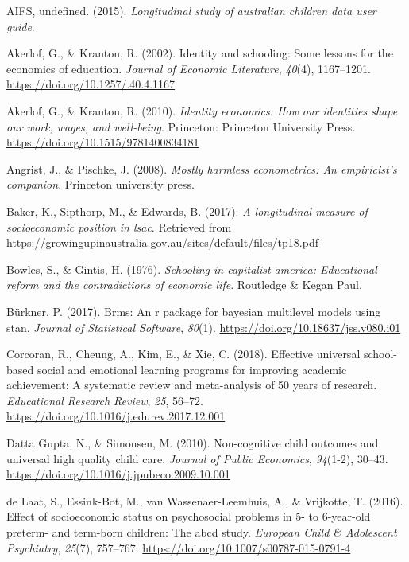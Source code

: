 \documentclass[
  english,
  man]{apa6}
\newlength{\cslhangindent}
\newenvironment{cslreferences}%
  {\setlength{\parindent}{0pt}%
  \everypar{\setlength{\hangindent}{\cslhangindent}}\ignorespaces}%
  {\par}
\begin{document}
\hypertarget{refs}{}
\begin{cslreferences}
\leavevmode\hypertarget{ref-aifs2015}{}%
AIFS, undefined. (2015). \emph{Longitudinal study of australian children data user guide}.

\leavevmode\hypertarget{ref-akerlof2002}{}%
Akerlof, G., \& Kranton, R. (2002). Identity and schooling: Some lessons for the economics of education. \emph{Journal of Economic Literature}, \emph{40}(4), 1167--1201. \url{https://doi.org/10.1257/.40.4.1167}

\leavevmode\hypertarget{ref-akerlof2010}{}%
Akerlof, G., \& Kranton, R. (2010). \emph{Identity economics: How our identities shape our work, wages, and well-being}. Princeton: Princeton University Press. \url{https://doi.org/10.1515/9781400834181}

\leavevmode\hypertarget{ref-angrist2008}{}%
Angrist, J., \& Pischke, J. (2008). \emph{Mostly harmless econometrics: An empiricist's companion}. Princeton university press.

\leavevmode\hypertarget{ref-baker2017}{}%
Baker, K., Sipthorp, M., \& Edwards, B. (2017). \emph{A longitudinal measure of socioeconomic position in lsac}. Retrieved from \url{https://growingupinaustralia.gov.au/sites/default/files/tp18.pdf}

\leavevmode\hypertarget{ref-bowles1976}{}%
Bowles, S., \& Gintis, H. (1976). \emph{Schooling in capitalist america: Educational reform and the contradictions of economic life}. Routledge \& Kegan Paul.

\leavevmode\hypertarget{ref-buxfcrkner2017}{}%
Bürkner, P. (2017). Brms: An r package for bayesian multilevel models using stan. \emph{Journal of Statistical Software}, \emph{80}(1). \url{https://doi.org/10.18637/jss.v080.i01}

\leavevmode\hypertarget{ref-corcoran2018}{}%
Corcoran, R., Cheung, A., Kim, E., \& Xie, C. (2018). Effective universal school-based social and emotional learning programs for improving academic achievement: A systematic review and meta-analysis of 50 years of research. \emph{Educational Research Review}, \emph{25}, 56--72. \url{https://doi.org/10.1016/j.edurev.2017.12.001}

\leavevmode\hypertarget{ref-dattagupta2010}{}%
Datta Gupta, N., \& Simonsen, M. (2010). Non-cognitive child outcomes and universal high quality child care. \emph{Journal of Public Economics}, \emph{94}(1-2), 30--43. \url{https://doi.org/10.1016/j.jpubeco.2009.10.001}

\leavevmode\hypertarget{ref-delaat2016}{}%
de Laat, S., Essink-Bot, M., van Wassenaer-Leemhuis, A., \& Vrijkotte, T. (2016). Effect of socioeconomic status on psychosocial problems in 5- to 6-year-old preterm- and term-born children: The abcd study. \emph{European Child \& Adolescent Psychiatry}, \emph{25}(7), 757--767. \url{https://doi.org/10.1007/s00787-015-0791-4}


\end{cslreferences}
\end{document}
